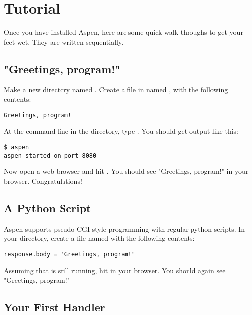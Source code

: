 \chapter{Tutorial \label{tutorial}}

Once you have installed Aspen, here are some quick walk-throughs to get your
feet wet. They are written sequentially.


\section{"Greetings, program!" \label{tutorial-greetings-program}}

Make a new directory named . Create a file in 
named , with the following contents:

\begin{verbatim}
Greetings, program!
\end{verbatim}

At the command line in the  directory, type . You
should get output like this:

\begin{verbatim}
$ aspen
aspen started on port 8080
\end{verbatim}

Now open a web browser and hit . You should see
"Greetings, program!" in your browser. Congratulations!


\section{A Python Script \label{tutorial-pyscript}}

Aspen supports pseudo-CGI-style programming with regular python scripts. In your
 directory, create a file named  with the following
contents:

\begin{verbatim}
response.body = "Greetings, program!"
\end{verbatim}

Assuming that  is still running, hit
 in your browser. You should again see
"Greetings, program!"


\section{Your First Handler \label{tutorial-handler}}

